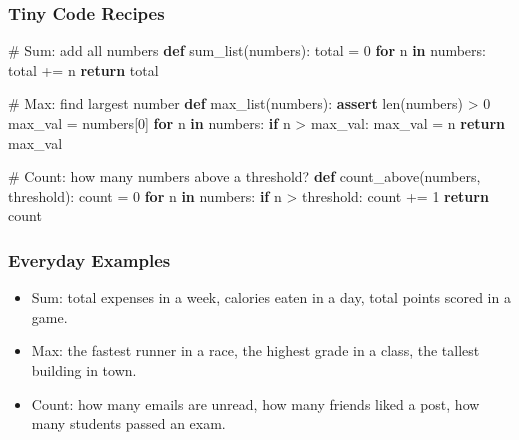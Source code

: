 \documentclass[
  letterpaper,
  DIV=11,
  numbers=noendperiod]{scrreprt}
\newenvironment{Shaded}{\begin{snugshade}}{\end{snugshade}}
\newcommand{\BuiltInTok}[1]{\textcolor[rgb]{0.00,0.23,0.31}{#1}}
\newcommand{\CommentTok}[1]{\textcolor[rgb]{0.37,0.37,0.37}{#1}}
\newcommand{\ControlFlowTok}[1]{\textcolor[rgb]{0.00,0.23,0.31}{\textbf{#1}}}
\newcommand{\DecValTok}[1]{\textcolor[rgb]{0.68,0.00,0.00}{#1}}
\newcommand{\KeywordTok}[1]{\textcolor[rgb]{0.00,0.23,0.31}{\textbf{#1}}}
\newcommand{\NormalTok}[1]{\textcolor[rgb]{0.00,0.23,0.31}{#1}}
\newcommand{\OperatorTok}[1]{\textcolor[rgb]{0.37,0.37,0.37}{#1}}
\providecommand{\tightlist}{%
  \setlength{\itemsep}{0pt}\setlength{\parskip}{0pt}}
\begin{document}
\subsubsection{Tiny Code Recipes}\label{tiny-code-recipes}

\begin{Shaded}
\begin{Highlighting}[]
\CommentTok{\# Sum: add all numbers}
\KeywordTok{def}\NormalTok{ sum\_list(numbers):}
\NormalTok{    total }\OperatorTok{=} \DecValTok{0}
    \ControlFlowTok{for}\NormalTok{ n }\KeywordTok{in}\NormalTok{ numbers:}
\NormalTok{        total }\OperatorTok{+=}\NormalTok{ n}
    \ControlFlowTok{return}\NormalTok{ total}

\CommentTok{\# Max: find largest number}
\KeywordTok{def}\NormalTok{ max\_list(numbers):}
    \ControlFlowTok{assert} \BuiltInTok{len}\NormalTok{(numbers) }\OperatorTok{\textgreater{}} \DecValTok{0}
\NormalTok{    max\_val }\OperatorTok{=}\NormalTok{ numbers[}\DecValTok{0}\NormalTok{]}
    \ControlFlowTok{for}\NormalTok{ n }\KeywordTok{in}\NormalTok{ numbers:}
        \ControlFlowTok{if}\NormalTok{ n }\OperatorTok{\textgreater{}}\NormalTok{ max\_val:}
\NormalTok{            max\_val }\OperatorTok{=}\NormalTok{ n}
    \ControlFlowTok{return}\NormalTok{ max\_val}

\CommentTok{\# Count: how many numbers above a threshold?}
\KeywordTok{def}\NormalTok{ count\_above(numbers, threshold):}
\NormalTok{    count }\OperatorTok{=} \DecValTok{0}
    \ControlFlowTok{for}\NormalTok{ n }\KeywordTok{in}\NormalTok{ numbers:}
        \ControlFlowTok{if}\NormalTok{ n }\OperatorTok{\textgreater{}}\NormalTok{ threshold:}
\NormalTok{            count }\OperatorTok{+=} \DecValTok{1}
    \ControlFlowTok{return}\NormalTok{ count}
\end{Highlighting}
\end{Shaded}

\subsubsection{Everyday Examples}\label{everyday-examples-8}

\begin{itemize}
\tightlist
\item
  Sum: total expenses in a week, calories eaten in a day, total points
  scored in a game.
\item
  Max: the fastest runner in a race, the highest grade in a class, the
  tallest building in town.
\item
  Count: how many emails are unread, how many friends liked a post, how
  many students passed an exam.
\end{itemize}
\end{document}
